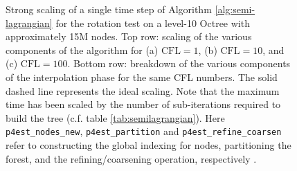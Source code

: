 \begin{figure}[htbp]
\begin{center}
	\end{center}
	\caption{Strong scaling of a single time step of Algorithm \ref{alg:semi-lagrangian} for the rotation test on a level-10 Octree with approximately 15M nodes. Top row: scaling of the various components of the algorithm for (a) $\text{CFL} = 1$, (b) $\text{CFL} = 10$, and (c) $\text{CFL} = 100$. Bottom row: breakdown of the various components of the interpolation phase for the same CFL numbers. The solid dashed line represents the ideal scaling. Note that the maximum time has been scaled by the number of sub-iterations required to build the tree (c.f. table \ref{tab:semilagrangian}). Here \texttt{p4est\_nodes\_new}, \texttt{p4est\_partition} and \texttt{p4est\_refine\_coarsen} refer to constructing the global indexing for nodes, partitioning the forest, and the refining/coarsening operation, respectively \cite{Burstedde;Wilcox;Ghattas:11:p4est:-Scalable-Algo}.}
	\label{fig:semilagrangian_small}
\end{figure}

